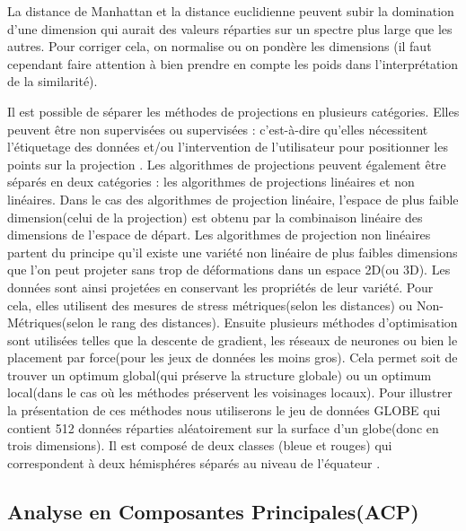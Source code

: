 \smallskip
La distance de Manhattan et la distance euclidienne peuvent subir la domination d’une dimension qui aurait des valeurs réparties sur un spectre plus large que les autres\cite{HeulotThese}. Pour corriger cela, on normalise ou on pondère les dimensions (il faut cependant faire attention à bien prendre en compte les poids dans l’interprétation de la similarité).

\medskip
Il est possible de séparer les méthodes de projections en plusieurs catégories.
Elles peuvent être non supervisées ou supervisées : c’est-à-dire qu’elles nécessitent l’étiquetage des données et/ou l’intervention de l’utilisateur pour positionner les points sur la projection\cite{karimi2018Supervised} \cite{HeulotThese}. 
Les algorithmes de projections peuvent également être séparés en deux catégories : les algorithmes de projections linéaires et non linéaires.
Dans le cas des algorithmes de projection linéaire, l’espace de plus faible dimension(celui de la projection) est obtenu par la combinaison linéaire des dimensions de l’espace de départ.
\smallskip
\newline
Les algorithmes de projection non linéaires partent du principe qu'il existe une variété non linéaire de plus faibles dimensions que l’on peut projeter sans trop de déformations dans un espace 2D(ou 3D). Les données sont ainsi projetées en conservant les propriétés de leur variété. Pour cela, elles utilisent des mesures de stress métriques(selon les distances) ou Non-Métriques(selon le rang des distances). 
Ensuite plusieurs méthodes d’optimisation sont utilisées telles que la descente de gradient, les réseaux de neurones\cite{hwang1991GradientNeuralNetwork} ou bien le placement par force(pour les jeux de données les moins gros)\cite{dickhaus2014ForceBrute}. 
Cela permet soit de trouver un optimum global(qui préserve la structure globale) ou un optimum local(dans le cas où les méthodes préservent les voisinages locaux).
Pour illustrer la présentation de ces méthodes nous utiliserons le jeu de données GLOBE qui contient 512 données réparties aléatoirement sur la surface d'un globe(donc en trois dimensions).
Il est composé de deux classes (bleue et rouges) qui correspondent à deux hémisphéres séparés au niveau de l'équateur \cite{colange_steering_2020}.
\smallskip


\subsection{Analyse en Composantes Principales(ACP)}

